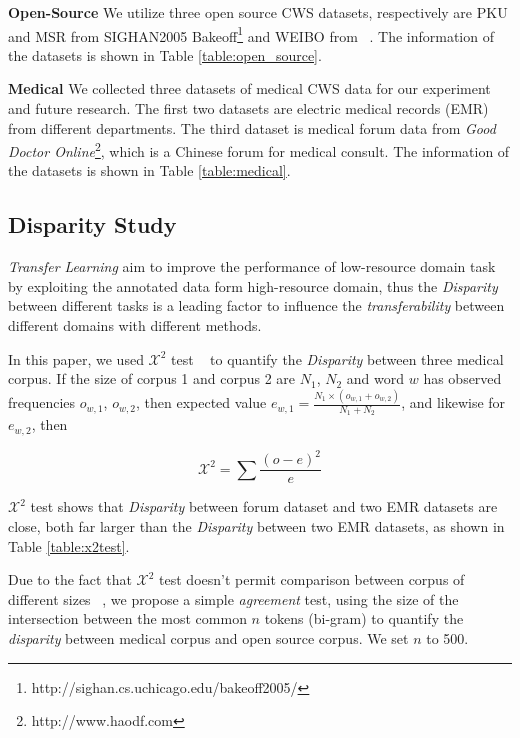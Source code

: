 \noindent \textbf{Open-Source} We utilize three open source CWS datasets, respectively are PKU and MSR from SIGHAN2005 Bakeoff\footnote{http://sighan.cs.uchicago.edu/bakeoff2005/} and WEIBO from ~\cite{qiu2016overview}. The information of the datasets is shown in Table \ref{table:open_source}.

\noindent \textbf{Medical} We collected three datasets of medical CWS data for our experiment and future research. The first two datasets are electric medical records (EMR) from different departments. The third dataset is medical forum data from \textit{Good Doctor Online}\footnote{http://www.haodf.com}, which is a Chinese forum for medical consult. The information of the datasets is shown in Table \ref{table:medical}.

\subsection{Disparity Study}

\textit{Transfer Learning} aim to improve the performance of low-resource domain task by exploiting the annotated data form high-resource domain, thus the \textit{Disparity} between different tasks is a leading factor to influence the \textit{transferability} between different domains with different methods.

In this paper, we used $\mathcal{X}^2$ test ~\cite{DBLP:conf/emnlp/KilgarriffR98} to quantify the \textit{Disparity} between three medical corpus. If the size of corpus 1 and corpus 2 are $N_1$, $N_2$ and word $w$ has observed frequencies $o_{w,1}$, $o_{w,2}$, then expected value $e_{w,1} = \frac{N_1 \times (o_{w,1}+o_{w,2})}{N_1+N_2}$, and likewise for $e_{w,2}$, then 

\begin{equation}
\mathcal{X}^2 = \sum \frac{(o-e)^2}{e}
\end{equation}

$\mathcal{X}^2$ test shows that \textit{Disparity} between forum dataset and two EMR datasets are close, both far larger than the \textit{Disparity} between two EMR datasets, as shown in Table \ref{table:x2test}.

Due to the fact that $\mathcal{X}^2$ test doesn't permit comparison between corpus of different sizes ~\cite{DBLP:conf/emnlp/KilgarriffR98}, we propose a simple \textit{agreement} test, using the size of the intersection between the most common $n$ tokens (bi-gram) to quantify the \textit{disparity} between medical corpus and open source corpus.  We set $n$ to 500.

